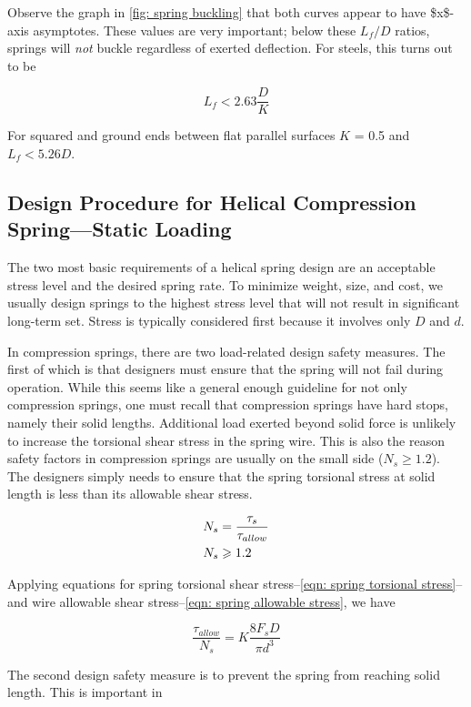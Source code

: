 \documentclass[a4paper,openany,12pt]{book}
\begin{document}
{{Observe the graph in \ref{fig: spring buckling}
that both curves appear to have \$x\$-axis asymptotes. These values are
very important; below these \(L_f/D\) ratios, springs will \emph{not} buckle
regardless of exerted deflection. For steels, this turns out to be

$$L_f < 2.63 \frac{D}{K}$$

For squared and ground ends between flat parallel surfaces \(K\) = 0.5 and
\(L_f < 5.26 D\).

\subsection{Design Procedure for Helical Compression Spring---Static Loading}
\label{design-procedure-for-helical-compression-springstatic-loading}
The two most basic requirements of a helical spring design are an
acceptable stress level and the desired spring rate. To minimize weight,
size, and cost, we usually design springs to the highest stress level
that will not result in significant long-term set. Stress is typically
considered first because it involves only \(D\) and \(d\).

In compression springs, there are two load-related design safety
measures. The first of which is that designers must ensure that the
spring will not fail during operation. While this seems like a general
enough guideline for not only compression springs, one must recall that
compression springs have hard stops, namely their solid lengths.
Additional load exerted beyond solid force is unlikely to increase the
torsional shear stress in the spring wire. This is also the reason
safety factors in compression springs are usually on the small side
(\(N_s \geq 1.2\)). The designers simply needs to ensure that the spring
torsional stress at solid length is less than its allowable shear
stress.

\begin{gather}
\label{eqn: spring allowable stress}
  N_s = \frac{\tau _s}{\tau _{allow}} \hfill \\
  N_s \geqslant 1.2 \hfill \\ 
\end{gather}

Applying equations for spring torsional shear
stress--\ref{eqn: spring torsional stress}--and
wire allowable shear
stress--\ref{eqn: spring allowable stress},
we have

$$\frac{\tau _{allow}}{N_s} = K\frac{8F_sD}{\pi d^3}$$

The second design safety measure is to prevent the spring from reaching
solid length. This is important in

}}
\end{document}
